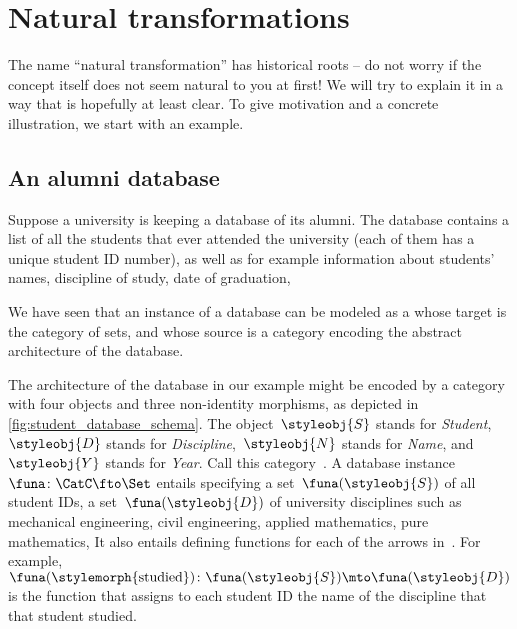 
\section{Natural transformations}


The name ``natural transformation'' has historical roots -- do not worry if the concept itself does not seem natural to you at first!
We will try to explain it in a way that is hopefully at least clear.
To give motivation and a concrete illustration, we start with an example.

\subsection{An alumni database}

Suppose a university is keeping a database of its alumni.
The database contains a list of all the students that ever attended the university (each of them has a unique student ID number), as well as for example information about students' names, discipline of study, date of graduation, \etc

We have seen that an instance of a database can be modeled as a  whose target is the category of sets, and whose source is a category encoding the abstract architecture of the database.

%
\begin{marginfigure}
    \centering
    \caption{}
    \label{fig:student_database_schema}
\end{marginfigure}
%

The architecture of the database in our example might be encoded by a category with four objects and three non-identity morphisms, as depicted in \cref{fig:student_database_schema}.
The object~$\styleobj{S}$ stands for \emph{Student},~$\styleobj{D}$ stands for \emph{Discipline},~$\styleobj{N}$ stands for \emph{Name}, and~$\styleobj{Y}$ stands for \emph{Year}.
Call this category~\CatC.
A database instance~$\funa \colon \CatC \fto \Set$ entails specifying a set~$\funa(\styleobj{S})$ of all student IDs, a set~$\funa(\styleobj{D})$ of university disciplines such as mechanical engineering, civil engineering, applied mathematics, pure mathematics, \etc
It also entails defining functions for each of the arrows in~\CatC.
For example,~$\funa(\stylemorph{\text{studied}}) \colon \funa(\styleobj{S}) \mto \funa(\styleobj{D})$ is the function that assigns to each student ID the name of the discipline that that student studied.

